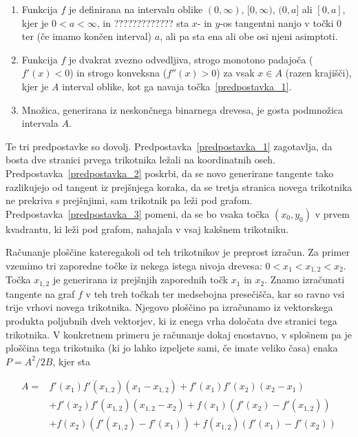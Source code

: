 \documentclass[a4paper, 12pt, titlepage]{article}
\begin{document}
\begin{enumerate}
    \item \label{predpostavka_1} Funkcija $ f $ je definirana na intervalu oblike $(0, \infty)$, $[0,\infty)$, $(0,a]$ ali $[0,a]$, kjer je $ 0 < a < \infty $, in ????????????? sta $x$- in $y$-os tangentni nanjo v točki 0 ter (če imamo končen interval) $a$, ali pa sta ena ali obe osi njeni asimptoti.
    \item \label{predpostavka_2} Funkcija $ f $ je dvakrat zvezno odvedljiva, strogo monotono padajoča ($ f'(x) < 0 $) in strogo konveksna ($ f''(x) > 0 $) za vsak $ x \in A$ (razen krajišči), kjer je $ A $ interval oblike, kot ga navaja točka~\ref{predpostavka_1}.
    \item \label{predpostavka_3} Množica, generirana iz neskončnega binarnega drevesa, je gosta podmnožica intervala $ A $.
\end{enumerate}

Te tri predpostavke so dovolj. Predpostavka~\ref{predpostavka_1} zagotavlja, da bosta dve stranici prvega trikotnika ležali na koordinatnih oseh. Predpostavka~\ref{predpostavka_2} poskrbi, da se novo generirane tangente tako razlikujejo od tangent iz prejšnjega koraka, da se tretja stranica novega trikotnika ne prekriva s prejšnjimi, sam trikotnik pa leži pod grafom. Predpostavka~\ref{predpostavka_3} pomeni, da se bo vsaka točka $ (x_0, y_0) $ v prvem kvadrantu, ki leži pod grafom, nahajala v vsaj kakšnem trikotniku.

Računanje ploščine kateregakoli od teh trikotnikov je preprost izračun. Za primer vzemimo tri zaporedne točke iz nekega istega nivoja drevesa: $ 0 < x_1 < x_{1,2} < x_2 $. Točka $ x_{1,2} $ je generirana iz prejšnjih zaporednih točk $ x_1 $ in $ x_2 $. Znamo izračunati tangente na graf $ f $ v teh treh točkah ter medsebojna presečišča, kar so ravno vsi trije vrhovi novega trikotnika. Njegovo ploščino pa izračunamo iz vektorskega produkta poljubnih dveh vektorjev, ki iz enega vrha določata dve stranici tega trikotnika. V konkretnem primeru je računanje dokaj enostavno, v splošnem pa je ploščina tega trikotnika (ki jo lahko izpeljete sami, če imate veliko časa) enaka $ P = A^2/2B $, kjer sta

\begin{align*}
    A =  &f'(x_1)f'(x_{1,2})(x_1 - x_{1,2}) + f'(x_1)f'(x_2)(x_2 - x_1) \\
&+ f'(x_2)f'(x_{1,2})(x_{1,2} - x_2) + f(x_1)(f'(x_2) - f'(x_{1,2})) \\
&+ f(x_2)(f'(x_{1,2}) - f'(x_1)) + f(x_{1,2})(f'(x_1) - f'(x_2))
\end{align*}
\end{document}
